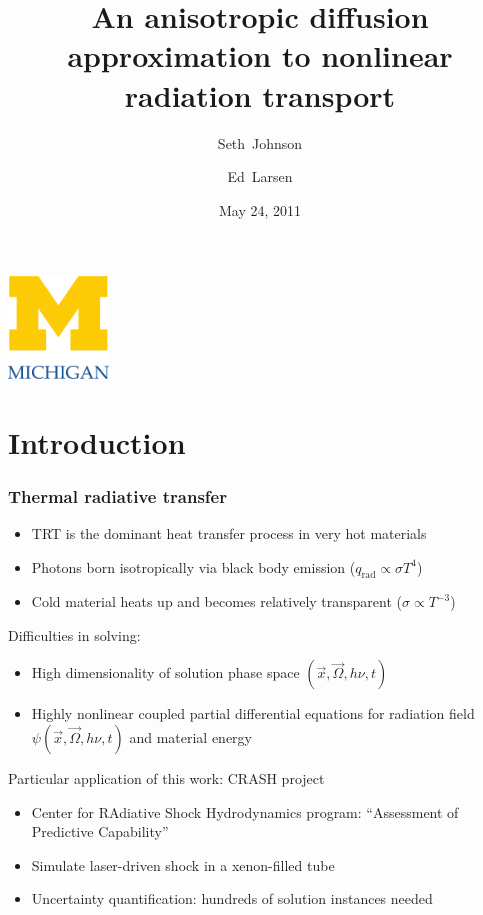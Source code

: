 \documentclass{beamer}
\title[KAPL Seminar]%
{An anisotropic diffusion approximation to nonlinear radiation transport}
\author[SRJ, EWL]{Seth~Johnson \and Ed~Larsen}
\institute[UMich]{
University of Michigan, Ann Arbor
}
\date[5/24/2011]{May 24, 2011}
\begin{document}

\begin{frame}
\titlepage
\begin{center}
  \includegraphics[width=0.2\textwidth]{../figures/umlogo}
\end{center}
\end{frame}

\section{Introduction}
\begin{frame}
  \frametitle{Thermal radiative transfer}
  \begin{itemize}
    \item TRT is the dominant heat transfer process in very hot materials
    \item Photons born isotropically via black body emission
      ($q_\text{rad} \propto \sigma T^4$)
    \item Cold material heats up and becomes relatively transparent
      ($\sigma\propto T^{-3}$)
  \end{itemize}

  Difficulties in solving:
  \begin{itemize}
    \item High dimensionality of solution phase space $(\vec{x}, \vec{\Omega},
      h\nu, t)$
    \item Highly nonlinear coupled partial differential equations for radiation
      field $\psi(\vec{x}, \vec{\Omega}, h\nu, t)$ and material energy
  \end{itemize}

  Particular application of this work: CRASH project
  \begin{itemize}
    \item Center for RAdiative Shock Hydrodynamics program: ``Assessment
      of Predictive Capability''
    \item Simulate laser-driven shock in a xenon-filled tube
    \item Uncertainty quantification: hundreds of solution instances needed
  \end{itemize}
\end{frame}
\end{document}
